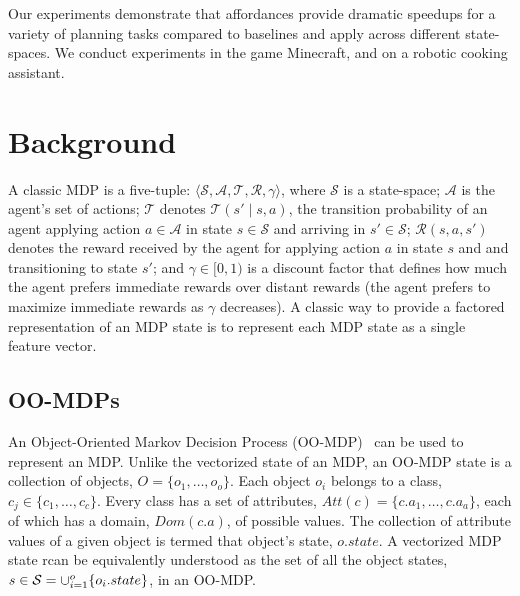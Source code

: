 \documentclass[conference]{IEEEtran}
\begin{document}
Our experiments demonstrate that affordances provide dramatic speedups for a variety
of planning tasks compared to baselines and apply across different state-spaces.  We conduct experiments
in the game Minecraft, and on a robotic cooking assistant. 

\section{Background}
A classic MDP is a five-tuple: $\langle \mathcal{S}, \mathcal{A}, \mathcal{T},
\mathcal{R}, \gamma \rangle$, where $\mathcal{S}$ is a state-space;
$\mathcal{A}$ is the agent's set of actions; $\mathcal{T}$ denotes
$\mathcal{T}(s' \mid s,a)$, the transition probability of an agent
applying action $a \in \mathcal{A}$ in state $s \in \mathcal{S}$ and
arriving in $s' \in \mathcal{S}$; $\mathcal{R}(s,a,s')$ denotes the
reward received by the agent for applying action $a$ in state $s$ and
and transitioning to state $s'$; and $\gamma \in [0, 1)$ is a discount
  factor that defines how much the agent prefers immediate rewards
  over distant rewards (the agent prefers to maximize
  immediate rewards as $\gamma$ decreases). A classic way to 
  provide a factored representation of an MDP state is to represent
each MDP state as a single feature vector. 

\subsection{OO-MDPs}
An Object-Oriented Markov
Decision Process (OO-MDP)~\citep{diuk08} can be used to represent an MDP.
Unlike the vectorized state of an MDP, an OO-MDP state is a collection of objects,
$O = \{o_1, \ldots, o_o \}$.  Each object $o_i$ belongs to a
class, $c_j \in  \{c_1, \ldots, c_c\}$. Every class has a set of attributes,
$Att(c) = \{c.a_1, \ldots, c.a_a \}$, each of which has a domain, $Dom(c.a)$, of 
possible values. The collection of attribute values of a given object is termed 
that object's state, $o.state$. A vectorized MDP state rcan be equivalently understood as the set
of all the object states, $s \in {\cal S} = \cup_{i = 1}^o \{o_i.state\}$, in an OO-MDP. 


\end{document}
